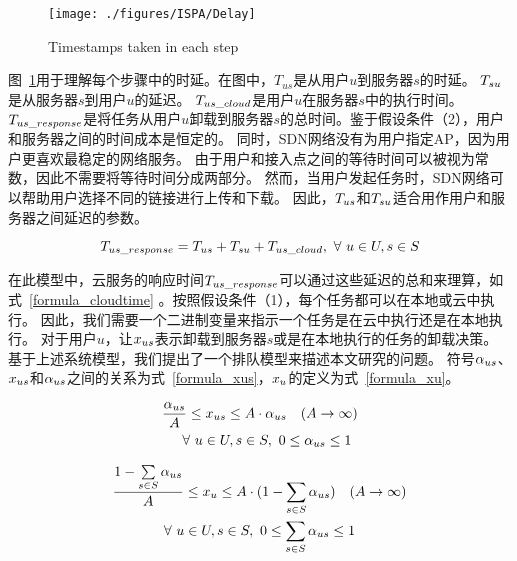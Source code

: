 \begin{figure}[!h]
  \centering
  \vspace{-1em}
  \texttt{[image: ./figures/ISPA/Delay]}
  \vspace{-1em}
  \caption{Timestamps taken in each step}
  \vspace{-1em}
  \label{fig_timestaps}
\end{figure}

图~\ref{fig_timestaps}用于理解每个步骤中的时延。在图中，${T}_{us}$是从用户$u$到服务器$s$的时延。 ${T}_{su}$是从服务器$s$到用户$u$的延迟。 ${T}_{us\_cloud}$是用户$u$在服务器$s$中的执行时间。 ${T}_{us\_response}$是将任务从用户$u$卸载到服务器$s$的总时间。鉴于假设条件（2），用户和服务器之间的时间成本是恒定的。 同时，SDN网络没有为用户指定AP，因为用户更喜欢最稳定的网络服务。 由于用户和接入点之间的等待时间可以被视为常数，因此不需要将等待时间分成两部分。 然而，当用户发起任务时，SDN网络可以帮助用户选择不同的链接进行上传和下载。 因此，${T}_{us}$和${T}_{su}$适合用作用户和服务器之间延迟的参数。

\vspace{-1.5em}
\begin{equation}
\label{formula_cloudtime}
{T}_{us\_response} = {T}_{us} + {T}_{su} + {T}_{us\_cloud},\ \forall \ u \in U, s \in S
\end{equation}

在此模型中，云服务的响应时间${T}_{us\_response}$可以通过这些延迟的总和来理算，如式~\eqref{formula_cloudtime} 。按照假设条件（1），每个任务都可以在本地或云中执行。 因此，我们需要一个二进制变量来指示一个任务是在云中执行还是在本地执行。 对于用户$u$，让${x}_{us}$表示卸载到服务器$s$或是在本地执行的任务的卸载决策。 基于上述系统模型，我们提出了一个排队模型来描述本文研究的问题。 符号${\alpha}_{us}$、${x}_{us}$和${\alpha}_{us}$之间的关系为式~\eqref{formula_xus}，${x}_{u}$的定义为式~\eqref{formula_xu}。

\begin{equation}
  \label{formula_xus}
  \begin{gathered}
  \frac{{\alpha}_{us}}{A} \leq {x}_{us} \leq A \cdot {\alpha}_{us} \quad (A \to \infty) \\
  \quad \forall \ u \in U, s \in S, \ 0\leq {\alpha}_{us} \leq 1
  \end{gathered}
\end{equation}

\vspace{-0.5em}
\begin{equation}
\label{formula_xu}
\begin{gathered}
\frac{1 - \sum\limits_{s \in S}{{\alpha}_{us}}}{A} \leq {x}_{u} \leq A \cdot (1 - \sum_{s \in S}{{\alpha}_{us}}) \quad (A \to \infty) \\
\forall\ u \in U, s \in S, \ 0\leq \sum_{s \in S}{{\alpha}_{us}} \leq 1
\end{gathered}
\end{equation}

